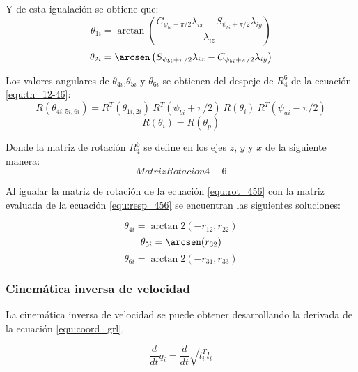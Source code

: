 Y de esta igualación se obtiene que:
\begin{equation}
\theta_{1i} = \arctan\left(\frac{C_{\psi_{bi}+\pi/2} \lambda_{ix} + S_{\psi_{bi}+\pi/2} \lambda_{iy}}{\lambda_{iz}}\right)
\end{equation}
\begin{equation}
\theta_{2i} = \arcsen\left(S_{\psi_{bi}+\pi/2} \lambda_{ix} - C_{\psi_{bi}+\pi/2} \lambda_{iy}\right)
\end{equation}

Los valores angulares de $\theta_{4i}$,$\theta_{5i}$ y $\theta_{6i}$ se obtienen del despeje de $R_4^6$ de la ecuación \ref{equ:th_12-46}:
\begin{equation}\label{equ:resp_456}
R(\theta_{4i,5i,6i})= R^T(\theta_{1i,2i})\ R^T(\psi_{bi}+\pi/2)\ R(\theta_i)\ R^T(\psi_{ai}-\pi/2)
\end{equation}
\begin{equation*}
R(\theta_i) = R(\theta_p)
\end{equation*}

Donde la matriz de rotación $R_4^6$ se define en los ejes $z$, $y$ y $x$ de la siguiente manera:
\begin{equation}\label{equ:rot_456}
Matriz Rotacion 4-6
\end{equation}

Al igualar la matriz de rotación de la ecuación \ref{equ:rot_456} con la matriz evaluada de la ecuación \ref{equ:resp_456} se encuentran las siguientes soluciones:

\begin{equation}
\theta_{4i} = \arctan2 (-r_{12},r_{22})
\end{equation}
\begin{equation}
\theta_{5i} = \arcsen (r_{32})
\end{equation}
\begin{equation}
\theta_{6i} = \arctan2 (-r_{31},r_{33})
\end{equation}

\subsubsection{Cinemática inversa de velocidad}
La cinemática inversa de velocidad se puede obtener desarrollando la derivada de la ecuación \ref{equ:coord_grl}.

\begin{equation}
\frac{d}{dt}q_i = \frac{d}{dt}\sqrt{l_i^Tl_i} 
\end{equation}


